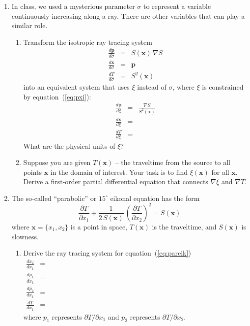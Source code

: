 \begin{enumerate}
\item In class, we used a mysterious parameter $\sigma$ to represent a
  variable continuously increasing along a ray. There are other
  variables that can play a similar role.
  \begin{enumerate}
  \item Transform the isotropic ray tracing system
    \begin{eqnarray}
      \label{eq:psigma}
      \frac{d \mathbf{p}}{d \sigma} & = & S(\mathbf{x})\,\nabla S \\
      \label{eq:xsigma}
      \frac{d \mathbf{x}}{d \sigma} & = & \mathbf{p} \\
      \label{eq:tsigma}
      \frac{d T}{d \sigma} & = & S^2(\mathbf{x})
    \end{eqnarray}
    into an equivalent system that uses $\xi$ instead of
    $\sigma$, where $\xi$ is constrained by equation~(\ref{eq:pxi}):
    \begin{eqnarray} 
      \label{eq:pxi}
      \frac{d \mathbf{p}}{d \xi} & = & \frac{\nabla S}{S^2(\mathbf{x})} \\
      \label{eq:xxi}
      \frac{d \mathbf{x}}{d \xi} & = & \\ 
      \label{eq:txi}
      \frac{d T}{d \xi} & = & 
    \end{eqnarray}
What are the physical units of $\xi$?      
  \item Suppose you are given $T(\mathbf{x})$ -- the traveltime from
  the source to all points $\mathbf{x}$ in the domain of
  interest. Your task is to find $\xi(\mathbf{x})$ for all $\mathbf{x}$. Derive a first-order partial
  differential equation that connects $\nabla \xi$ and $\nabla T$.
  \end{enumerate}

\item The so-called ``parabolic'' or $15^{\circ}$ eikonal
  equation \cite[]{tappert,iei,bamberger} has the form
  \begin{equation}
    {\frac{\partial T}{\partial x_1}} + 
    {\frac{1}{2\,S(\mathbf{x})}\,\left(\frac{\partial T}{\partial x_2}\right)^2} =
    {S(\mathbf{x})}
    \label{eq:pareik}
  \end{equation}
  where $\mathbf{x}=\{x_1,x_2\}$ is a point in space, $T(\mathbf{x})$
  is the traveltime, and $S(\mathbf{x})$ is slowness. 
  \begin{enumerate}
  \item Derive the ray tracing system for equation~(\ref{eq:pareik})
    \begin{eqnarray}
      \label{eq:xt}
      \frac{d x_2}{d x_1} & = & \hspace{5in} \\
      \label{eq:pxt}
      \frac{d p_1}{d x_1} & = & \\
      \label{eq:pzt}
      \frac{d p_2}{d x_1} & = & \\
      \label{eq:tt}
      \frac{d T}{d x_1} & = &
    \end{eqnarray}
    where $p_1$ represents $\partial T/\partial x_1$ and 
    $p_2$ represents $\partial T/\partial x_2$.
   

\end{enumerate}
\end{enumerate}
